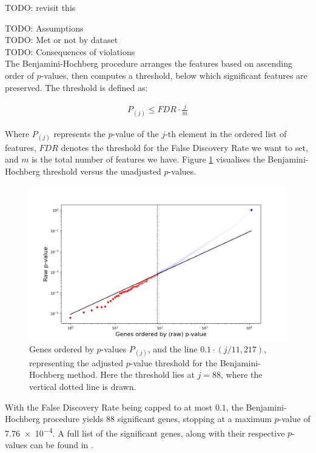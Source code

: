 \documentclass[twocolumn]{article}
\begin{document}
TODO: revisit this

TODO: Assumptions\\
TODO: Met or not by dataset\\
TODO: Consequences of violations\\

The Benjamini-Hochberg procedure arranges the features based on ascending order of $p$-values, then computes a threshold, below which significant features are preserved. The threshold is defined as:

\begin{align*}
    P_{(j)} \leq FDR\cdot\frac{j}{m}
\end{align*}

Where $P_{(j)}$ represents the $p$-value of the $j$-th element in the ordered list of features, $FDR$ denotes the threshold for the False Discovery Rate we want to set, and $m$ is the total number of features we have. Figure \ref{fig:bh-threshold} visualises the Benjamini-Hochberg threshold versus the unadjusted $p$-values.

\begin{figure}[H]
    \centering
    \includegraphics[width=\linewidth]{figures/SVA_Significant_Genes.png}
    \caption{Genes ordered by $p$-values $P_{(j)}$, and the line $0.1\cdot(j/11,217)$, representing the adjusted $p$-value threshold for the Benjamini-Hochberg method. Here the threshold lies at $j=88$, where the vertical dotted line is drawn.}
    \label{fig:bh-threshold}
\end{figure}

With the False Discovery Rate being capped to at most $0.1$, the Benjamini-Hochberg procedure yields $88$ significant genes, stopping at a maximum $p$-value of \num{7.76e-4}. A full list of the significant genes, along with their respective $p$-values can be found in .
\end{document}
